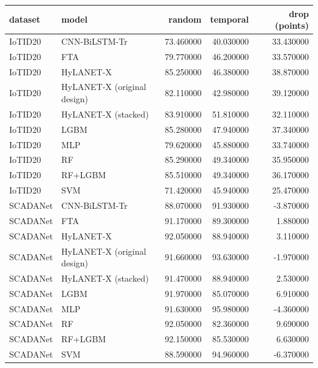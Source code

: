 \begin{tabular}{llrrr}
\toprule
dataset & model & random & temporal & drop (points) \\
\midrule
IoTID20 & CNN-BiLSTM-Tr & 73.460000 & 40.030000 & 33.430000 \\
IoTID20 & FTA & 79.770000 & 46.200000 & 33.570000 \\
IoTID20 & HyLANET-X & 85.250000 & 46.380000 & 38.870000 \\
IoTID20 & HyLANET-X (original design) & 82.110000 & 42.980000 & 39.120000 \\
IoTID20 & HyLANET-X (stacked) & 83.910000 & 51.810000 & 32.110000 \\
IoTID20 & LGBM & 85.280000 & 47.940000 & 37.340000 \\
IoTID20 & MLP & 79.620000 & 45.880000 & 33.740000 \\
IoTID20 & RF & 85.290000 & 49.340000 & 35.950000 \\
IoTID20 & RF+LGBM & 85.510000 & 49.340000 & 36.170000 \\
IoTID20 & SVM & 71.420000 & 45.940000 & 25.470000 \\
SCADANet & CNN-BiLSTM-Tr & 88.070000 & 91.930000 & -3.870000 \\
SCADANet & FTA & 91.170000 & 89.300000 & 1.880000 \\
SCADANet & HyLANET-X & 92.050000 & 88.940000 & 3.110000 \\
SCADANet & HyLANET-X (original design) & 91.660000 & 93.630000 & -1.970000 \\
SCADANet & HyLANET-X (stacked) & 91.470000 & 88.940000 & 2.530000 \\
SCADANet & LGBM & 91.970000 & 85.070000 & 6.910000 \\
SCADANet & MLP & 91.630000 & 95.980000 & -4.360000 \\
SCADANet & RF & 92.050000 & 82.360000 & 9.690000 \\
SCADANet & RF+LGBM & 92.150000 & 85.530000 & 6.630000 \\
SCADANet & SVM & 88.590000 & 94.960000 & -6.370000 \\
\bottomrule
\end{tabular}
